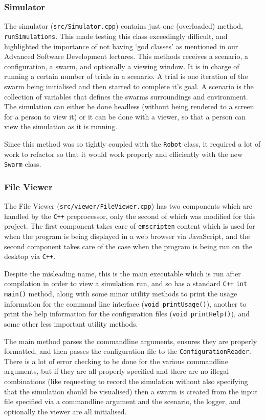 \documentclass[11pt,a4paper]{article}
\begin{document}
\subsubsection{Simulator}
The simulator (\texttt{src/Simulator.cpp}) contains just one (overloaded)
method, \texttt{runSimulations}. This made testing this class exceedingly
difficult, and highlighted the importance of not having `god classes' as
mentioned in our Advanced Software Development lectures. This methods receives a
scenario, a configuration, a swarm, and optionally a viewing window. It is in
charge of running a certain number of trials in a scenario. A trial is one
iteration of the swarm being initialised and then started to complete it's
goal. A scenario is the collection of variables that defines the swarms
surroundings and environment. The simulation can either be done headless
(without being rendered to a screen for a person to view it) or it can be done
with a viewer, so that a person can view the simulation as it is running.

Since this method was so tightly coupled with the \texttt{Robot} class, it
required a lot of work to refactor so that it would work properly and
efficiently with the new \texttt{Swarm} class.


\subsubsection{File Viewer}
The File Viewer (\texttt{src/viewer/FileViewer.cpp}) has two components which
are handled by the \texttt{C++} preprocessor, only the second of which was
modified for this project. The first component takes care of \texttt{emscripten}
content which is used for when the program is being displayed in a web browser
via JavaScript, and the second component takes care of the case when the
program is being run on the desktop via \texttt{C++}. 

Despite the misleading name, this is the main executable which is run after
compilation in order to view a simulation run, and so has a standard
\texttt{C++} \texttt{int main()} method, along with some minor utility methods
to print the usage information for the command line interface (\texttt{void
printUsage()}), another to print the help information for the configuration
files (\texttt{void printHelp()}), and some other less important utility
methods.

The main method parses the commandline arguments, ensures they are properly
formatted, and then passes the configuration file to the
\texttt{ConfigurationReader}. There is a lot of error checking to be done for
the various commandline arguments, but if they are all properly specified and
there are no illegal combinations (like requesting to record the simulation
without also specifying that the simulation should be visualised) then a swarm
is created from the input file specified via a commandline argument and the
scenario, the logger, and optionally the viewer are all initialised.
\end{document}
